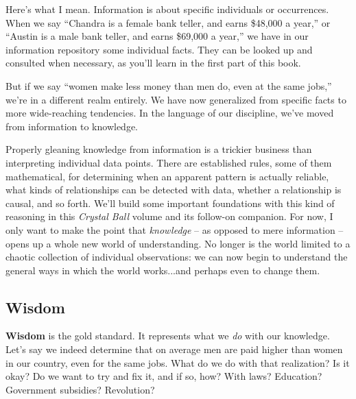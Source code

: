 
Here's what I mean. Information is about specific individuals or occurrences.
When we say ``Chandra is a female bank teller, and earns \$48,000 a year,'' or
``Austin is a male bank teller, and earns \$69,000 a year,'' we have in our
information repository some individual facts. They can be looked up and
consulted when necessary, as you'll learn in the first part of this book.

But if we say ``women make less money than men do, even at the same jobs,''
we're in a different realm entirely. We have now generalized from specific
facts to more wide-reaching tendencies. In the language of our discipline,
we've moved from information to knowledge.

Properly gleaning knowledge from information is a trickier business than
interpreting individual data points. There are established rules, some of them
mathematical, for determining when an apparent pattern is actually reliable,
what kinds of relationships can be detected with data, whether a relationship
is causal, and so forth. We'll build some important foundations with this kind
of reasoning in this \textit{Crystal Ball} volume and its follow-on companion.
For now, I only want to make the point that \textit{knowledge} -- as opposed to
mere information -- opens up a whole new world of understanding. No longer is
the world limited to a chaotic collection of individual observations: we can
now begin to understand the general ways in which the world works...and perhaps
even to change them.

\subsection{Wisdom}

\textbf{Wisdom} is the gold standard. It represents what we \textit{do} with
our knowledge. Let's say we indeed determine that on average men are paid
higher than women in our country, even for the same jobs. What do we do with
that realization? Is it okay? Do we want to try and fix it, and if so, how?
With laws? Education? Government subsidies? Revolution?


